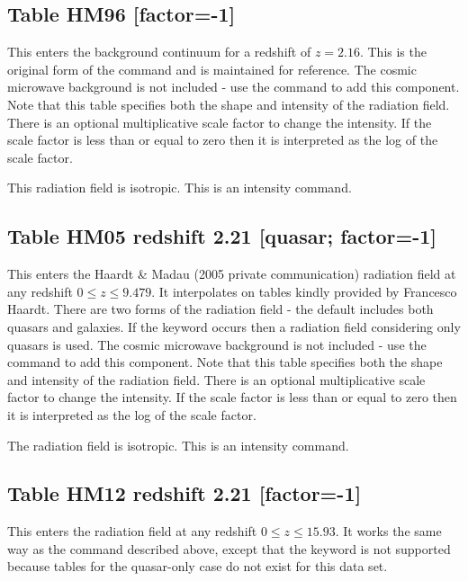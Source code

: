 \subsection{Table HM96 [factor=-1]}

This enters the \citet{Haardt1996} background continuum for a redshift
of $z = 2.16$.  This is the original form of the command and is maintained
for reference.  The cosmic microwave background is not included - use the
 command to add this component.  Note that
this table specifies both the shape and intensity of the radiation field.
There
is an optional multiplicative scale factor to change the intensity.  If
the scale factor is less than or equal to zero then it is interpreted as
the log of the scale factor.

This radiation field is isotropic.
This is an intensity command.

\subsection{Table HM05 redshift 2.21 [quasar; factor=-1]}

This enters the Haardt \& Madau (2005 private communication)
radiation field at any redshift $0 \le z \le 9.479$.  It
interpolates on tables kindly provided by Francesco Haardt.  There are
two forms of the radiation field - the default includes both quasars
and galaxies.  If the keyword  occurs then a
radiation field considering only quasars is used.  The cosmic
microwave background is not included - use the  command
to add this component.  Note that this table specifies both the shape
and intensity of the radiation field.  There is an optional
multiplicative scale factor to change the intensity.  If the scale
factor is less than or equal to zero then it is interpreted as the log
of the scale factor.

The radiation field is isotropic.
This is an intensity command.

\subsection{Table HM12 redshift 2.21 [factor=-1]}

This enters the \citet{HaardtMadau2012} radiation field at any redshift $0 \le
z \le 15.93$. It works the same way as the  command
described above, except that the keyword  is not supported
because tables for the quasar-only case do not exist for this data set.

